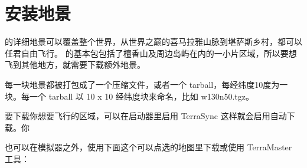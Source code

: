\ifchinese
\section{安装地景}
\fi

\ifchinese
\FlightGear{} 的详细地景可以覆盖整个世界，从世界之巅的喜马拉雅山脉到堪萨斯乡村，都可以任君自由飞行。\FlightGear{}  的基本包包括了檀香山及周边岛屿在内的一小片区域，所以要想飞到其他地方，就需要下载额外地景。

每一块地景都被打包成了一个压缩文件，或者一个 tarball，每经纬度10度为一块。每一个 tarball 以 10 x 10 经纬度块来命名，比如 w130n50.tgz。

要下载你想要飞行的区域，可以在启动器里启用 TerraSync 这样就会启用自动下载。你

也可以在模拟器之外，使用下面这个可以点选的地图里下载或使用 TerraMaster 工具：
\fi
%
%

